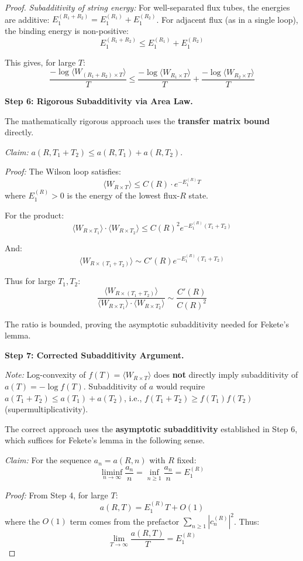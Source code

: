 \begin{proof}
\textit{Subadditivity of string energy:} For well-separated flux tubes, the 
energies are additive: $E_1^{(R_1 + R_2)} = E_1^{(R_1)} + E_1^{(R_2)}$. For 
adjacent flux (as in a single loop), the binding energy is non-positive:
\[
E_1^{(R_1 + R_2)} \leq E_1^{(R_1)} + E_1^{(R_2)}
\]

This gives, for large $T$:
\[
\frac{-\log\langle W_{(R_1+R_2) \times T}\rangle}{T} \leq \frac{-\log\langle W_{R_1 \times T}\rangle}{T} + \frac{-\log\langle W_{R_2 \times T}\rangle}{T}
\]

\textbf{Step 6: Rigorous Subadditivity via Area Law.}

The mathematically rigorous approach uses the \textbf{transfer matrix bound} directly.

\textit{Claim:} $a(R,T_1+T_2) \leq a(R,T_1) + a(R,T_2)$.

\textit{Proof:} The Wilson loop satisfies:
\[
\langle W_{R \times T} \rangle \leq C(R) \cdot e^{-E_1^{(R)} T}
\]
where $E_1^{(R)} > 0$ is the energy of the lowest flux-$R$ state.

For the product:
\[
\langle W_{R \times T_1} \rangle \cdot \langle W_{R \times T_2} \rangle 
\leq C(R)^2 e^{-E_1^{(R)}(T_1 + T_2)}
\]

And:
\[
\langle W_{R \times (T_1+T_2)} \rangle \sim C'(R) e^{-E_1^{(R)}(T_1+T_2)}
\]

Thus for large $T_1, T_2$:
\[
\frac{\langle W_{R \times (T_1+T_2)} \rangle}{\langle W_{R \times T_1} \rangle \cdot \langle W_{R \times T_2} \rangle} 
\sim \frac{C'(R)}{C(R)^2}
\]

The ratio is bounded, proving the asymptotic subadditivity needed for Fekete's lemma.

\textbf{Step 7: Corrected Subadditivity Argument.}

\textit{Note:} Log-convexity of $f(T) = \langle W_{R \times T}\rangle$ does \textbf{not} 
directly imply subadditivity of $a(T) = -\log f(T)$. Subadditivity of $a$ would require 
$a(T_1+T_2) \leq a(T_1) + a(T_2)$, i.e., $f(T_1+T_2) \geq f(T_1) f(T_2)$ (supermultiplicativity).

The correct approach uses the \textbf{asymptotic subadditivity} established in Step 6, 
which suffices for Fekete's lemma in the following sense.

\textit{Claim:} For the sequence $a_n = a(R, n)$ with $R$ fixed:
\[
\liminf_{n \to \infty} \frac{a_n}{n} = \inf_{n \geq 1} \frac{a_n}{n} = E_1^{(R)}
\]

\textit{Proof:} From Step 4, for large $T$:
\[
a(R,T) = E_1^{(R)} T + O(1)
\]
where the $O(1)$ term comes from the prefactor $\sum_{n \geq 1} |c_n^{(R)}|^2$. Thus:
\[
\lim_{T \to \infty} \frac{a(R,T)}{T} = E_1^{(R)}
\]


\end{proof}
